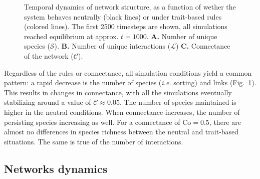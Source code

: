 \documentclass[10pt,twocolumn,fleqn]{article}
\begin{document}
\begin{figure}[tb]
\begin{center}
	\end{center}
	\caption{Temporal dynamics of network structure, as a function of wether the system behaves neutrally (black lines) or under trait-based rules (colored lines). The first 2500 timesteps are shown, all simulations reached equilibrium at approx. $t = 1000$. \textbf{A.} Number of unique species ($\mathcal{S}$). \textbf{B.} Number of unique interactions ($\mathcal{L}$) \textbf{C.} Connectance of the network ($\mathcal{C}$).}
	\label{f:comdyn}
\end{figure}

Regardless of the rules or connectance, all simulation conditions yield a common
pattern: a rapid decrease is the number of species (\emph{i.e.} sorting) and
links (Fig.~\ref{f:comdyn}). This results in changes in connectance, with all
the simulations eventually stabilizing around a value of $\mathcal{C}\approx
0.05$. The number of species maintained is higher in the neutral conditions.
When connectance increases, the number of persisting species increasing as well.
For a connectance of $\mathrm{Co} = 0.5$, there are almost no differences in
species richness between the neutral and trait-based situations. The same is
true of the number of interactions.

\subsection{Networks dynamics}



\end{document}
